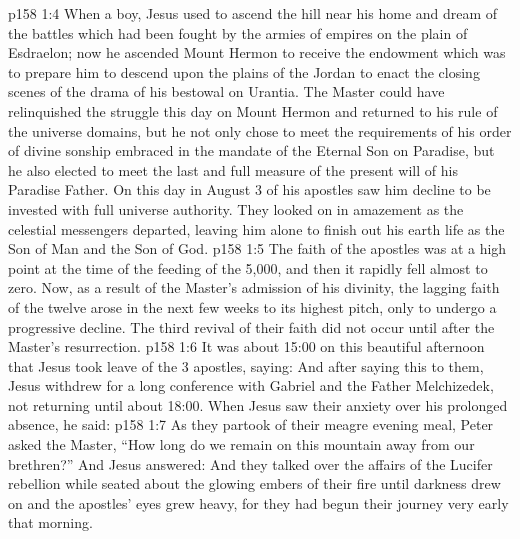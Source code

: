 \vs p158 1:4 When a boy, Jesus used to ascend the hill near his home and dream of the battles which had been fought by the armies of empires on the plain of Esdraelon; now he ascended Mount Hermon to receive the endowment which was to prepare him to descend upon the plains of the Jordan to enact the closing scenes of the drama of his bestowal on Urantia. The Master could have relinquished the struggle this day on Mount Hermon and returned to his rule of the universe domains, but he not only chose to meet the requirements of his order of divine sonship embraced in the mandate of the Eternal Son on Paradise, but he also elected to meet the last and full measure of the present will of his Paradise Father. On this day in August 3 of his apostles saw him decline to be invested with full universe authority. They looked on in amazement as the celestial messengers departed, leaving him alone to finish out his earth life as the Son of Man and the Son of God.
\vs p158 1:5 The faith of the apostles was at a high point at the time of the feeding of the 5,000, and then it rapidly fell almost to zero. Now, as a result of the Master’s admission of his divinity, the lagging faith of the twelve arose in the next few weeks to its highest pitch, only to undergo a progressive decline. The third revival of their faith did not occur until after the Master’s resurrection.
\vs p158 1:6 It was about 15:00 on this beautiful afternoon that Jesus took leave of the 3 apostles, saying:  And after saying this to them, Jesus withdrew for a long conference with Gabriel and the Father Melchizedek, not returning until about 18:00. When Jesus saw their anxiety over his prolonged absence, he said: 
\vs p158 1:7 As they partook of their meagre evening meal, Peter asked the Master, “How long do we remain on this mountain away from our brethren?” And Jesus answered:  And they talked over the affairs of the Lucifer rebellion while seated about the glowing embers of their fire until darkness drew on and the apostles’ eyes grew heavy, for they had begun their journey very early that morning.
